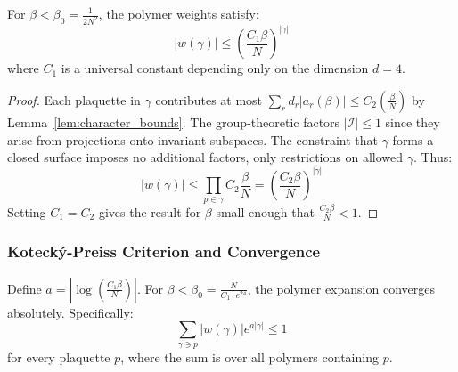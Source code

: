 \begin{lemma}
\label{lem:polymer_bounds}
For $\beta < \beta_0 = \frac{1}{2N^2}$, the polymer weights satisfy:
\begin{equation}
|w(\gamma)| \leq \left(\frac{C_1 \beta}{N}\right)^{|\gamma|}
\end{equation}
where $C_1$ is a universal constant depending only on the dimension $d=4$.
\end{lemma}

\begin{proof}
Each plaquette in $\gamma$ contributes at most $\sum_r d_r |a_r(\beta)| \leq C_2(\frac{\beta}{N})$ by Lemma~\ref{lem:character_bounds}. The group-theoretic factors $|\mathcal{I}| \leq 1$ since they arise from projections onto invariant subspaces. The constraint that $\gamma$ forms a closed surface imposes no additional factors, only restrictions on allowed $\gamma$. Thus:
\begin{equation}
|w(\gamma)| \leq \prod_{p \in \gamma} C_2 \frac{\beta}{N} = \left(\frac{C_2\beta}{N}\right)^{|\gamma|}
\end{equation}
Setting $C_1 = C_2$ gives the result for $\beta$ small enough that $\frac{C_2\beta}{N} < 1$.
\end{proof}

\subsubsection{Kotecký-Preiss Criterion and Convergence}

\begin{theorem}
\label{thm:kp_rigorous}
Define $a = |\log(\frac{C_1\beta}{N})|$. For $\beta < \beta_0 = \frac{N}{C_1 \cdot e^{24}}$, the polymer expansion converges absolutely. Specifically:
\begin{equation}
\sum_{\gamma \ni p} |w(\gamma)| e^{a|\gamma|} \leq 1
\end{equation}
for every plaquette $p$, where the sum is over all polymers containing $p$.
\end{theorem}


